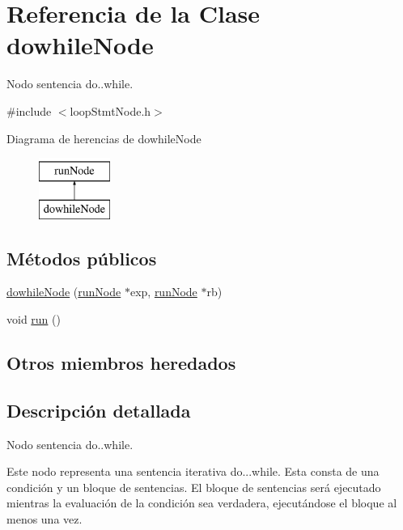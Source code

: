 \hypertarget{classdowhileNode}{\section{Referencia de la Clase dowhile\-Node}
\label{classdowhileNode}
}


Nodo sentencia do..while.  




{\ttfamily \#include $<$loop\-Stmt\-Node.\-h$>$}

Diagrama de herencias de dowhile\-Node\begin{figure}[H]
\begin{center}
\leavevmode
\includegraphics[height=2.000000cm]{classdowhileNode}
\end{center}
\end{figure}
\subsection*{Métodos públicos}
\begin{DoxyCompactItemize}
\item 
\hyperlink{classdowhileNode_a0300c826e3ae9bd1894ba7b8ecc6db46}{dowhile\-Node} (\hyperlink{classrunNode}{run\-Node} $\ast$exp, \hyperlink{classrunNode}{run\-Node} $\ast$rb)
\item 
void \hyperlink{classdowhileNode_a347c599237629fdd55071a78a693d351}{run} ()
\end{DoxyCompactItemize}
\subsection*{Otros miembros heredados}


\subsection{Descripción detallada}
Nodo sentencia do..while. 

Este nodo representa una sentencia iterativa do...while. Esta consta de una condición y un bloque de sentencias. El bloque de sentencias será ejecutado mientras la evaluación de la condición sea verdadera, ejecutándose el bloque al menos una vez. 

